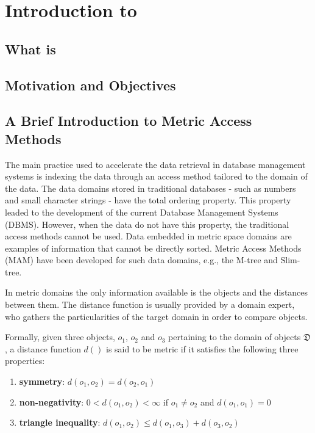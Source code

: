 \chapter{Introduction to \libname}

\section{What is \libname}

\section{Motivation and Objectives}

\section{A Brief Introduction to Metric Access Methods}

	The main practice used to accelerate the data retrieval in database management systems is indexing the data through an access method tailored to the domain of the data. The data domains stored in traditional databases - such as numbers and small character strings - have the total ordering property. This property leaded to the development of the current Database Management Systems (DBMS). However, when the data do not have this property, the traditional access methods cannot be used. Data embedded in metric space domains are examples of information that cannot be directly sorted. Metric Access Methods (MAM) have been developed for such data domains, e.g., the M-tree and Slim-tree.

	In metric domains the only information available is the objects and the distances between them. The distance function is usually provided by a domain expert, who gathers the particularities of the target domain in order to compare objects.

	Formally, given three objects, $o_1$, $o_2$ and $o_3$ pertaining to the domain of objects \textbf{$\mathfrak{D}$}, a distance function $d( )$ is said to be metric if it satisfies the following three properties:

\begin{enumerate}
	\item \textbf{symmetry}: $d(o_1, o_2) = d(o_2, o_1)$
	\item \textbf{non-negativity}: $0 < d(o_1, o_2) < \infty$ if $o_1 \neq o_2$ and $d(o_1,o_1) = 0$
	\item \textbf{triangle inequality}: $d(o_1, o_2) \leq d(o_1, o_3) + d(o_3, o_2)$
\end{enumerate}

